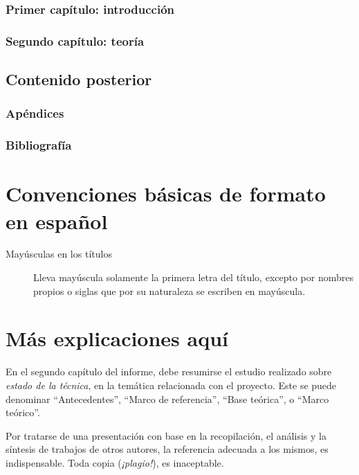 \subsubsection{Primer capítulo: introducción}

\subsubsection{Segundo capítulo: teoría}

\subsection{Contenido posterior}

\subsubsection{Apéndices}

\subsubsection{Bibliografía}

\section{Convenciones básicas de formato en español}

\begin{description}
\item[Mayúsculas en los títulos] Lleva mayúscula solamente la primera letra del título, excepto por nombres propios o siglas que por su naturaleza se escriben en mayúscula.
\end{description}


\section{Más explicaciones aquí}

En el segundo capítulo del informe, debe resumirse el estudio realizado sobre \emph{estado de la técnica}, en la temática relacionada con el proyecto.  Este se puede denominar ``Antecedentes'', ``Marco de referencia'', ``Base teórica'', o ``Marco teórico''.

Por tratarse de una presentación con base en la recopilación, el análisis y la síntesis de trabajos de otros autores, la referencia adecuada a los mismos, es indispensable.  Toda copia (\emph{¡plagio!}), es inaceptable.

